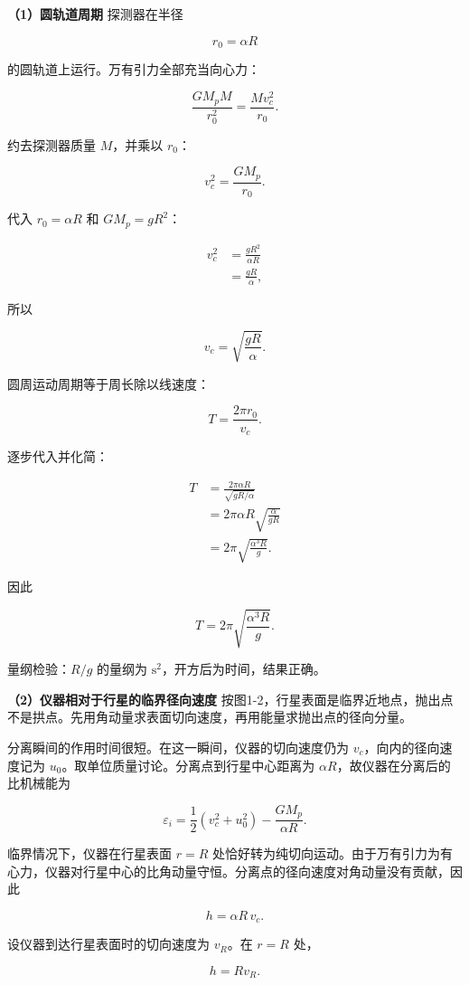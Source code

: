 \documentclass[12pt,a4paper,UTF8]{ctexart}
\begin{document}
\textbf{（1）圆轨道周期} 探测器在半径

\[r_0=\alpha R\]

的圆轨道上运行。万有引力全部充当向心力：

\[\frac{GM_{\!p}M}{r_0^2}=\frac{Mv_c^2}{r_0}.\]

约去探测器质量 \(M\)，并乘以 \(r_0\)：

\[v_c^2=\frac{GM_{\!p}}{r_0}.\]

代入 \(r_0=\alpha R\) 和 \(GM_{\!p}=gR^2\)：

\[\begin{aligned}
v_c^2
&=\frac{gR^2}{\alpha R}\\
&=\frac{gR}{\alpha},
\end{aligned}\]

所以

\[v_c=\sqrt{\frac{gR}{\alpha}}.\]

圆周运动周期等于周长除以线速度：

\[T=\frac{2\pi r_0}{v_c}.\]

逐步代入并化简：

\[\begin{aligned}
T
&=\frac{2\pi\alpha R}{\sqrt{gR/\alpha}}\\
&=2\pi\alpha R\sqrt{\frac{\alpha}{gR}}\\
&=2\pi\sqrt{\frac{\alpha^3R}{g}}.
\end{aligned}\]

因此

\[\boxed{T=2\pi\sqrt{\frac{\alpha^3R}{g}}}.\]

量纲检验：\(R/g\) 的量纲为 \(\mathrm{s^2}\)，开方后为时间，结果正确。

\textbf{（2）仪器相对于行星的临界径向速度}
按图1-2，行星表面是临界近地点，抛出点不是拱点。先用角动量求表面切向速度，再用能量求抛出点的径向分量。

分离瞬间的作用时间很短。在这一瞬间，仪器的切向速度仍为
\(v_c\)，向内的径向速度记为
\(u_0\)。取单位质量讨论。分离点到行星中心距离为
\(\alpha R\)，故仪器在分离后的比机械能为

\[\varepsilon_i=
\frac12\left(v_c^2+u_0^2\right)
-\frac{GM_{\!p}}{\alpha R}.\]

临界情况下，仪器在行星表面 \(r=R\)
处恰好转为纯切向运动。由于万有引力为有心力，仪器对行星中心的比角动量守恒。分离点的径向速度对角动量没有贡献，因此

\[h=\alpha R\,v_c.\]

设仪器到达行星表面时的切向速度为 \(v_R\)。在 \(r=R\) 处，

\[h=Rv_R.\]
\end{document}
